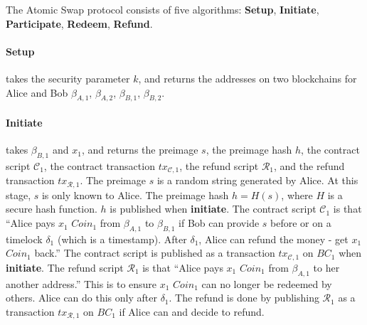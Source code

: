The Atomic Swap protocol consists of five algorithms:
\textbf{Setup},
\textbf{Initiate},
\textbf{Participate},
\textbf{Redeem},
\textbf{Refund}.


\paragraph{\textbf{Setup}}
takes the security parameter $k$,
and returns the addresses on two blockchains for Alice and Bob $\beta_{A, 1}$, $\beta_{A, 2}$, $\beta_{B, 1}$, $\beta_{B, 2}$.

\paragraph{\textbf{Initiate}}
takes $\beta_{B, 1}$ and $x_1$,
and returns the preimage $s$, the preimage hash $h$, the contract script $\mathcal{C}_1$, the contract transaction $tx_{\mathcal{C}, 1}$, the refund script $\mathcal{R}_1$, and the refund transaction $tx_{\mathcal{R}, 1}$.
The preimage $s$ is a random string generated by Alice. At this stage, $s$ is only known to Alice.
The preimage hash $h = H(s)$, where $H$ is a secure hash function.  $h$ is published when \textbf{initiate}.
The contract script $\mathcal{C}_1$ is that ``Alice pays $x_1$ $Coin_1$ from $\beta_{A, 1}$ to $\beta_{B, 1}$ if Bob can provide $s$ before or on a timelock $\delta_1$ (which is a timestamp). After $\delta_1$, Alice can refund the money - get $x_1$ $Coin_1$ back.''
The contract script is published as a transaction $tx_{\mathcal{C}, 1}$ on $BC_1$ when \textbf{initiate}.
The refund script $\mathcal{R}_1$ is that ``Alice pays $x_1$ $Coin_1$ from $\beta_{A, 1}$ to her another address.'' This is to ensure $x_1$ $Coin_1$ can no longer be redeemed by others. Alice can do this only after $\delta_1$.
The refund is done by publishing $\mathcal{R}_1$ as a transaction $tx_{\mathcal{R}, 1}$ on $BC_1$ if Alice can and decide to refund.


